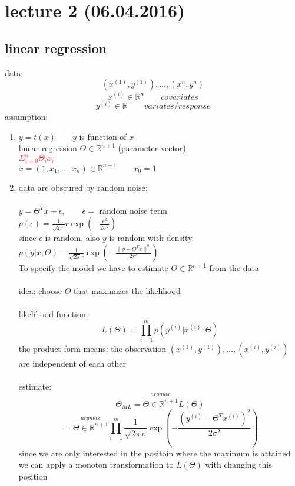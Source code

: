 \documentclass[a4paper, 12pt]{scrartcl}
\begin{document}
\section*{lecture 2 (06.04.2016)}
\subsection*{linear regression}
data: \space \[(x^{(1)}, y^{(1)}), \dots , (x^{n}, y^{n})\]
\[x^{(i)} \in \mathbb{R}^n \quad\quad covariates\]
\[y^{(i)} \in \mathbb{R} \quad\quad variates/response \]
assumption:
\begin{enumerate}[(1)]
\item $y = t(x) \quad\quad y$ is function of $x$\\
linear regression \space\space {} \space $\Theta \in \mathbb{R}^{n+1}$ (parameter vector)\\
\textcolor{red}{\quad\quad\quad\quad\quad\quad\quad\quad\quad$\Sigma^n_{i = 0} \Theta_i x_i$}\\
$x= (1,x_1, \dots ,x_n) \in \mathbb{R}^{n+1} \quad \quad x_0 = 1$
\item data are obscured by random noise:\\\\
$y = \Theta^T x +\epsilon, \quad\quad \epsilon = $ random noise term\\
$p(\epsilon) = \frac{1}{\sqrt{2\pi}} r \exp (- \frac{\epsilon^2}{2 \sigma^2})$\\
since $\epsilon$ is random, also $y$ is random with density $p(y|x, \Theta) - \frac{1}{\sqrt{2\pi}r} \exp (- \frac{\lVert y- \Theta^T x\lVert^2}{2r^2})$\\
To specify the model we have to estimate $\Theta \in \mathbb{R}^{n+1}$ from the data\\\\
idea: choose $\Theta$ that maximizes the likelihood\\\\
likelihood function:
\[L(\Theta) = \prod^m_{i=1} p(y^{(i)}|x^{(i)};\Theta)\]
the product form means: the observation $(x^{(1)},y^{(1)}), \dots , (x^{(i)}, y^{(i)})$ are independent of each other\\\\
estimate:
\[ \Theta_{ML} = \stackrel{argmax}{\Theta \in \mathbb{R}^{n+1}} L(\Theta) \]
\[ = \stackrel{argmax}{\Theta \in \mathbb{R}^{n+1}} \prod^m_{i=1} \frac{1}{\sqrt{2 \pi} \sigma} \exp \left(- \frac{(y^{(i)} - \Theta^T x^{(i)})^2}{2 \sigma^2}\right)\]
since we are only interested in the positoin where the maximum is attained we can apply a monoton transformation to $L(\Theta)$ with changing this position\\\\

\end{enumerate}
\end{document}
